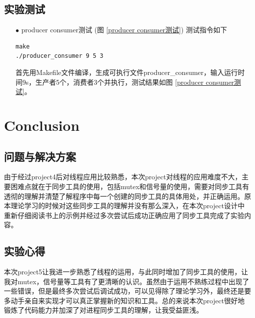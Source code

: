 \documentclass{article}
\begin{document}
\subsection{实验测试}
\begin{itemize}
\item[$\bullet$]producer consumer测试 (图 \ref{producer consumer测试})
测试指令如下
\begin{lstlisting}[language={[ANSI]C}]
make
./producer_consumer 9 5 3
\end{lstlisting}
首先用Makefile文件编译，生成可执行文件producer\_consumer，输入运行时间9s，生产者5个，消费者3个并执行，测试结果如图 \ref{producer consumer测试}。
\end{itemize}
\section{Conclusion}

\subsection{问题与解决方案}
由于经过project4后对线程应用比较熟悉，本次project对线程的应用难度不大，主要困难点就在于同步工具的使用，包括mutex和信号量的使用，需要对同步工具有透彻的理解并清楚了解程序中每一个创建的同步工具的具体用处，并正确运用。原本理论学习的时候对这些同步工具的理解并没有那么深入，在本次project设计中重新仔细阅读书上的示例并经过多次尝试后成功正确应用了同步工具完成了实验内容。

\subsection{实验心得}
本次project5让我进一步熟悉了线程的运用，与此同时增加了同步工具的使用，让我对mutex，信号量等工具有了更清晰的认识。虽然由于运用不熟练过程中出现了一些错误，但是最终多次尝试后调试成功，可以见得除了理论学习外，最终还是要多动手亲自来实现才可以真正掌握新的知识和工具。总的来说本次project很好地锻炼了代码能力并加深了对进程同步工具的理解，让我受益匪浅。




\end{document}
